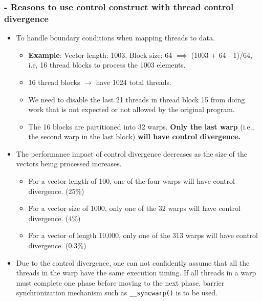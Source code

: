 \subsubsection{- Reasons to use control construct with thread control divergence}
\begin{itemize}
    \item To handle boundary conditions when mapping threads to data.
          \begin{itemize}

              \item \textbf{Example}: Vector length: 1003, Block size: 64 $\implies$ (1003 + 64 - 1)/64, i.e, 16 thread blocks to process the 1003 elements.
              \item 16 thread blocks $\rightarrow$ have 1024 total threads.
              \item We need to disable the last 21 threads in thread block 15 from doing work that is not expected or not allowed by the original program.
              \item The 16 blocks are partitioned into 32 warps. \textbf{Only the last warp} (i.e., the second warp in the last block) \textbf{will have control divergence.}
          \end{itemize}
    \item The performance impact of control divergence decreases as the size of the vectors being processed increases.
          \begin{itemize}
              \item For a vector length of 100, one of the four warps will have control divergence. (25\%)
              \item For a vector size of 1000, only one of the 32 warps will have control divergence. (4\%)
              \item For a vector of length 10,000, only one of the 313 warps will have control divergence. (0.3\%)
          \end{itemize}
    \item Due to the control divergence, one can not confidently assume that all the threads in the warp have the same execution timing. If all threads in a warp must complete one phase before moving to the next phase, barrier synchronization mechanism such as \texttt{\_\_syncwarp()} is to be used.
\end{itemize}
